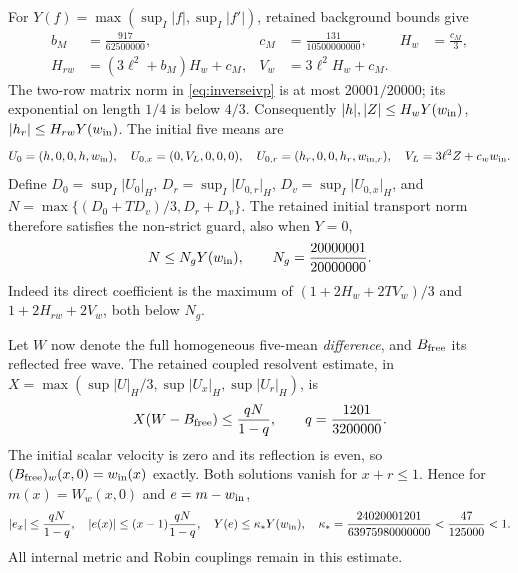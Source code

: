 \documentclass[11pt]{article}
\newcommand{\norm}[1]{\lvert #1\rvert_H}
\begin{document}
For $Y(f)=\max(\sup_I|f|,\sup_I|f'|)$, retained background bounds give
\begin{equation}
\begin{aligned}
 b_M&=\frac{917}{62500000},&
 c_M&=\frac{131}{10500000000},&
 H_w&=\frac{c_M}{3},\\
 H_{rw}&=(3\ell^2+b_M)H_w+c_M,&
 V_w&=3\ell^2H_w+c_M.
\end{aligned}
\end{equation}
The two-row matrix norm in \eqref{eq:inverseivp} is at most $20001/20000$;
its exponential on length $1/4$ is below $4/3$. Consequently
$|h|,|Z|\le H_wY(w_{\rm in})$, $|h_r|\le H_{rw}Y(w_{\rm in})$.
The initial five means are
\begin{equation}
 U_0=(h,0,0,h,w_{\rm in}),\quad
 U_{0,x}=(0,V_L,0,0,0),\quad
 U_{0,r}=(h_r,0,0,h_r,w_{{\rm in},r}),
 \quad V_L=3\ell^2Z+c_ww_{\rm in}.
\end{equation}
Define $D_0=\sup_I\norm{U_0}$, $D_r=\sup_I\norm{U_{0,r}}$,
$D_v=\sup_I\norm{U_{0,x}}$, and
$N=\max\{(D_0+TD_v)/3,D_r+D_v\}$.
The retained initial transport norm therefore satisfies the non-strict
guard, also when $Y=0$,
\begin{equation}
 N\le N_gY(w_{\rm in}),\qquad N_g=\frac{20000001}{20000000}.
 \label{eq:nguard}
\end{equation}
Indeed its direct coefficient is the maximum of
$(1+2H_w+2TV_w)/3$ and $1+2H_{rw}+2V_w$, both below $N_g$.

Let $W$ now denote the full homogeneous five-mean \emph{difference},
and $B_{\rm free}$ its reflected free wave. The retained coupled
resolvent estimate, in
$X=\max(\sup|U|_H/3,\sup|U_x|_H,\sup|U_r|_H)$, is
\begin{equation}
 X(W-B_{\rm free})\le\frac{qN}{1-q},\qquad
 q=\frac{1201}{3200000}.
\end{equation}
The initial scalar velocity is zero and its reflection is even, so
$(B_{\rm free})_w(x,0)=w_{\rm in}(x)$ exactly.
Both solutions vanish for $x+r\le1$. Hence for
$m(x)=W_w(x,0)$ and $e=m-w_{\rm in}$,
\begin{equation}
 |e_x|\le\frac{qN}{1-q},\quad
 |e(x)|\le(x-1)\frac{qN}{1-q},\quad
 Y(e)\le\kappa_*Y(w_{\rm in}),
 \quad
 \kappa_*=\frac{24020001201}{63975980000000}
       <\frac{47}{125000}<1.
 \label{eq:kappa}
\end{equation}
All internal metric and Robin couplings remain in this estimate.
\end{document}
